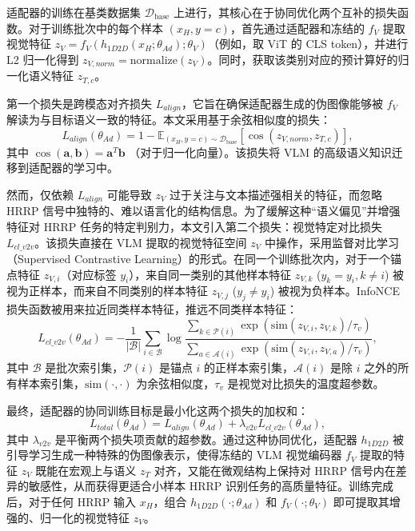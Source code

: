 适配器的训练在基类数据集 $\mathcal{D}_{\text{base}}$ 上进行，其核心在于协同优化两个互补的损失函数。对于训练批次中的每个样本 $(x_H, y=c)$，首先通过适配器和冻结的 $f_V$ 提取视觉特征 $z_V = f_V(h_{1D2D}(x_H; \theta_{Ad}); \theta_V)$（例如，取 ViT 的 CLS token），并进行 L2 归一化得到 $z_{V, norm} = \text{normalize}(z_V)$。同时，获取该类别对应的预计算好的归一化语义特征 $z_{T,c}$。 

第一个损失是跨模态对齐损失 $L_{align}$，它旨在确保适配器生成的伪图像能够被 $f_V$ 解读为与目标语义一致的特征。本文采用基于余弦相似度的损失： \begin{equation} L_{align}(\theta_{Ad}) = 1 - \mathbb{E}_{(x_H, y=c) \sim \mathcal{D}_{\text{base}}} \left[ \cos(z_{V, norm}, z_{T,c}) \right], \label{eq:adapter_align_loss_detail} \end{equation} 其中 $\cos(\mathbf{a}, \mathbf{b}) = \mathbf{a}^T \mathbf{b}$ （对于归一化向量）。该损失将 VLM 的高级语义知识迁移到适配器的学习中。 

然而，仅依赖 $L_{align}$ 可能导致 $z_V$ 过于关注与文本描述强相关的特征，而忽略 HRRP 信号中独特的、难以语言化的结构信息。为了缓解这种“语义偏见”并增强特征对 HRRP 任务的特定判别力，本文引入第二个损失：视觉特定对比损失 $L_{cl\_v2v}$。该损失直接在 VLM 提取的视觉特征空间 $z_V$ 中操作，采用监督对比学习（Supervised Contrastive Learning）的形式。在同一个训练批次内，对于一个锚点特征 $z_{V,i}$（对应标签 $y_i$），来自同一类别的其他样本特征 $z_{V,k}$ ($y_k=y_i, k \neq i$) 被视为正样本，而来自不同类别的样本特征 $z_{V,j}$ ($y_j \neq y_i$) 被视为负样本。InfoNCE 损失函数被用来拉近同类样本特征，推远不同类样本特征： 
\begin{equation} L_{cl\_v2v}(\theta_{Ad}) = -\frac{1}{|\mathcal{B}|}\sum_{i \in \mathcal{B}} \log \frac{\sum_{k \in \mathcal{P}(i)} \exp(\text{sim}(z_{V,i}, z_{V,k}) / \tau_v)}{\sum_{a \in \mathcal{A}(i)} \exp(\text{sim}(z_{V,i}, z_{V,a}) / \tau_v)}, \label{eq:adapter_contrastive_loss} \end{equation} 
其中 $\mathcal{B}$ 是批次索引集，$\mathcal{P}(i)$ 是锚点 $i$ 的正样本索引集，$\mathcal{A}(i)$ 是除 $i$ 之外的所有样本索引集，$\text{sim}(\cdot, \cdot)$ 为余弦相似度，$\tau_v$ 是视觉对比损失的温度超参数。 

最终，适配器的协同训练目标是最小化这两个损失的加权和： \begin{equation} L_{total}(\theta_{Ad}) = L_{align}(\theta_{Ad}) + \lambda_{v2v} L_{cl\_v2v}(\theta_{Ad}), \label{eq:adapter_total_loss} \end{equation} 其中 $\lambda_{v2v}$ 是平衡两个损失项贡献的超参数。通过这种协同优化，适配器 $h_{1D2D}$ 被引导学习生成一种特殊的伪图像表示，使得冻结的 VLM 视觉编码器 $f_V$ 提取的特征 $z_V$ 既能在宏观上与语义 $z_T$ 对齐，又能在微观结构上保持对 HRRP 信号内在差异的敏感性，从而获得更适合小样本 HRRP 识别任务的高质量特征。训练完成后，对于任何 HRRP 输入 $x_H$，组合 $h_{1D2D}(\cdot; \theta_{Ad})$ 和 $f_V(\cdot; \theta_V)$ 即可提取其增强的、归一化的视觉特征 $z_V$。

